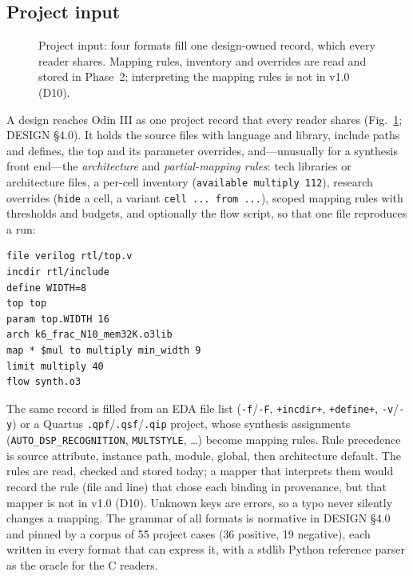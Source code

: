 \documentclass[conference]{IEEEtran}
\newcommand{\code}[1]{\texttt{#1}}
\begin{document}
\subsection{Project input}
\label{sec:project}

\begin{figure}[t]
\centering
\odinfit{\columnwidth}{}
\caption{Project input: four formats fill one design-owned record, which every reader shares.
Mapping rules, inventory and overrides are read and stored in Phase~2; interpreting the
mapping rules is not in v1.0 (D10).}
\label{fig:project}
\end{figure}

A design reaches Odin III as one project record that every reader shares
(Fig.~\ref{fig:project}; DESIGN \S4.0). It holds the source files with language and library,
include paths and defines, the top and its parameter overrides, and---unusually for a
synthesis front end---the \emph{architecture} and \emph{partial-mapping rules}: tech libraries
or architecture files, a per-cell inventory (\code{available multiply 112}), research overrides
(\code{hide} a cell, a variant \code{cell ... from ...}), scoped mapping rules with thresholds
and budgets, and optionally the flow script, so that one file reproduces a run:

\begin{lstlisting}
file verilog rtl/top.v
incdir rtl/include
define WIDTH=8
top top
param top.WIDTH 16
arch k6_frac_N10_mem32K.o3lib
map * $mul to multiply min_width 9
limit multiply 40
flow synth.o3
\end{lstlisting}

The same record is filled from an EDA file list (\code{-f}/\code{-F}, \code{+incdir+},
\code{+define+}, \code{-v}/\code{-y}) or a Quartus \code{.qpf}/\code{.qsf}/\code{.qip} project,
whose synthesis assignments (\code{AUTO\_DSP\_RECOGNITION}, \code{MULTSTYLE}, \ldots) become
mapping rules. Rule precedence is source attribute, instance path, module, global, then
architecture default. The rules are read, checked and stored today; a mapper that interprets
them would record the rule (file and line) that chose each binding in provenance, but that
mapper is not in v1.0 (D10). Unknown keys are errors, so a typo never silently changes a
mapping. The grammar of all formats is normative in DESIGN \S4.0 and pinned by a corpus of 55
project cases (36 positive, 19 negative), each written in every format that can express it,
with a stdlib Python reference parser as the oracle for the C readers.
\end{document}

